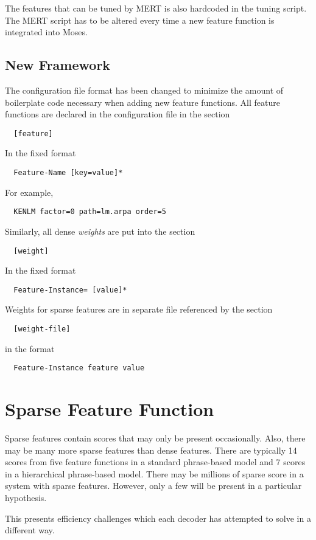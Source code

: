 \documentclass{pbml}
\begin{document}
The features that can be tuned by MERT is also hardcoded in the tuning script. The MERT script has to be altered every time a new feature function is integrated into Moses.

\subsection{New Framework}
The configuration file format has been changed to minimize the amount of boilerplate code necessary when adding new feature functions. All feature functions are declared in the configuration file in the section
\begin{verbatim}
  [feature]
\end{verbatim}
In the fixed format
\begin{verbatim}
  Feature-Name [key=value]*
\end{verbatim}
For example,
\begin{verbatim}
  KENLM factor=0 path=lm.arpa order=5
\end{verbatim}
Similarly, all dense \emph{weights} are put into the section
\begin{verbatim}
  [weight]
\end{verbatim}
In the fixed format
\begin{verbatim}
  Feature-Instance= [value]*
\end{verbatim}
Weights for sparse features are in separate file referenced by the section
\begin{verbatim}
  [weight-file]
\end{verbatim}
in the format
\begin{verbatim}
  Feature-Instance feature value
\end{verbatim}
  
\section{Sparse Feature Function}

Sparse features contain scores that may only be present occasionally. Also, there may be many more sparse features than dense features. There are typically 14 scores from five feature functions in a standard phrase-based model and 7 scores in a hierarchical phrase-based model. There may be millions of sparse score in a system with sparse features. However, only a few will be present in a particular hypothesis.

This presents efficiency challenges which each decoder has attempted to solve in a different way.
\end{document}
